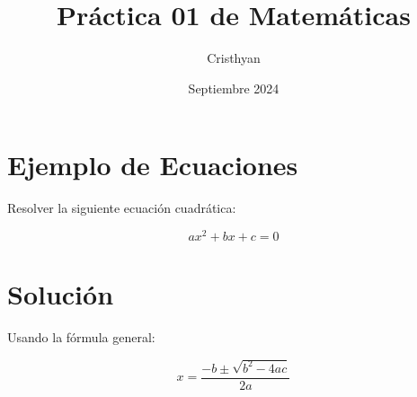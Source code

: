 \documentclass{article}
\title{Práctica 01 de Matemáticas}
\author{Cristhyan}
\date{Septiembre 2024}
\begin{document}
\maketitle

\section{Ejemplo de Ecuaciones}
Resolver la siguiente ecuación cuadrática:

\[
ax^2 + bx + c = 0
\]

\section{Solución}
Usando la fórmula general:

\[
x = \frac{-b \pm \sqrt{b^2 - 4ac}}{2a}
\]
\end{document}
